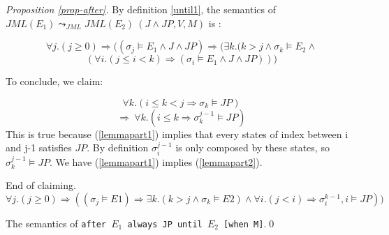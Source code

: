 










\begin{proof}[Proposition \ref{prop-after}]
By definition  \ref{until1}, the semantics of $JML(E_1) \leadsto_{JML} JML(E_2) ~(J \wedge JP,V,M)$ is :

$$ \forall j . (j \geq 0) \Rightarrow ((\sigma_j \models E_1 \wedge J \wedge JP) \Rightarrow (\exists k . (k > j \wedge \sigma_k \models E_2 \wedge $$
$$(\forall i . (j \leq i < k) \Rightarrow (\sigma_i \models E_1 \wedge J \wedge JP )))$$

To conclude, we claim:

\begin{equation} 
\label{lemmapart1} 
\forall k. ( i \leq k < j \Rightarrow  \sigma_k \models JP)
\end{equation}
\begin{equation} 
\label{lemmapart2} 
\Rightarrow ~\forall k. (i \leq k \Rightarrow \sigma_k^{j-1} \models JP)
\end{equation}
This is true because (\ref{lemmapart1}) implies that every states of index  between i and j-1 satisfies $JP$. By definition $\sigma_i^{j-1}$ is only composed by these states, so $\sigma_k^{j-1} \models JP$. We have (\ref{lemmapart1}) implies (\ref{lemmapart2}).

End of claiming.
$$ \forall j.(j\geq0) \Rightarrow ((\sigma_j \models E1) \Rightarrow \exists k. (k>j \wedge \sigma_k \models E2) \wedge \forall i.(j < i) \Rightarrow \sigma_i^{k-1},i \models JP))$$

The semantics of \texttt{after $E_1$ always JP until $E_2$ [when M]}.\qed
\end{proof}







